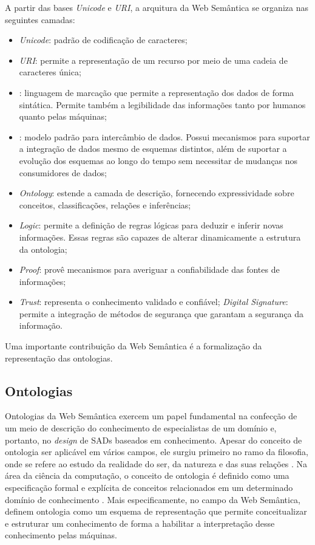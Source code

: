     A partir das bases \textit{Unicode} e \textit{URI}, a arquitura da Web Semântica se organiza nas seguintes camadas:
    
    \begin{itemize}
    	\item \textit{Unicode}: padrão de codificação de caracteres;
        \item \textit{URI}: permite a representação de um recurso por meio de uma cadeia de caracteres única;
        \item {}: linguagem de marcação que permite a representação dos dados de forma sintática. Permite também a legibilidade das informações tanto por humanos quanto pelas máquinas;
        \item {}: modelo padrão para intercâmbio de dados. Possui mecanismos para suportar a integração de dados mesmo de esquemas distintos, além de suportar a evolução dos esquemas ao longo do tempo sem necessitar de mudanças nos consumidores de dados;
        \item \textit{Ontology}: estende a camada de descrição, fornecendo expressividade sobre conceitos, classificações, relações e inferências;
        \item \textit{Logic}: permite a definição de regras lógicas para deduzir e inferir novas informações. Essas regras são capazes de alterar dinamicamente a estrutura da ontologia;
        \item \textit{Proof}: provê mecanismos para averiguar a confiabilidade das fontes de informações;
        \item \textit{Trust}: representa o conhecimento validado e confiável;
        \textit{Digital Signature}: permite a integração de métodos de segurança que garantam a segurança da informação.
    \end{itemize}
    
    Uma importante contribuição da Web Semântica é a formalização da representação das ontologias.
    
    \subsection{Ontologias}
    
    	Ontologias da Web Semântica exercem um papel fundamental na confecção de um meio de descrição do conhecimento de especialistas de um domínio e, portanto, no \textit{design} de SADs baseados em conhecimento. Apesar do conceito de ontologia ser aplicável em vários campos, ele surgiu primeiro no ramo da filosofia, onde se refere ao estudo da realidade do ser,  da natureza e das suas relações \cite{sep-logic-ontology}.  Na área da ciência da computação, o conceito de ontologia é definido como uma especificação formal e explícita de conceitos relacionados em um determinado domínio de conhecimento \cite{Noy2001}. Mais especificamente, no campo da Web Semântica,  definem ontologia como um esquema de representação que permite conceitualizar e estruturar um conhecimento de forma a habilitar a interpretação desse conhecimento pelas máquinas.
    
